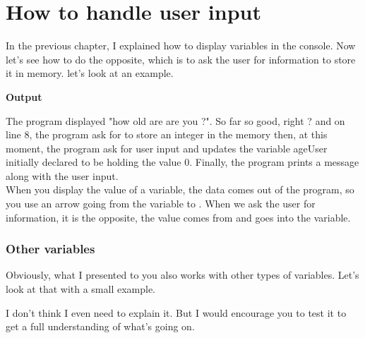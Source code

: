 \documentclass[11pt, a4paper]{article}
\begin{document}
\section{How to handle user input}
In the previous chapter, I explained how to display variables in the console. 
Now let’s see how to do the opposite, which is to ask the user for information
to store it in memory. let's look at an example.

\textbf{Output}

The program displayed "how old are are you ?". So far so good, right ? and on line 8,
the program ask for to store an integer in the memory then, at this moment, the program
ask for user input and updates the variable ageUser initially declared to be holding the
value 0. Finally, the program prints a message along with the user input.\\
When you display the value of a variable, the data comes out of the program,
so you use an arrow going from the variable to . When we ask the user
for information, it is the opposite, the value comes from  and goes into the variable.

\subsubsection{Other variables}
Obviously, what I presented to you also works with other types of variables.
Let’s look at that with a small example.

I don’t think I even need to explain it. But I would encourage you to test
it to get a full understanding of what’s going on.
\end{document}
